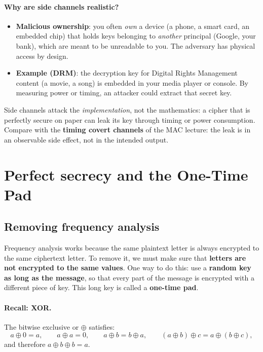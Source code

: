 \paragraph{Why are side channels realistic?}
\begin{itemize}
    \item \textbf{Malicious ownership}: you often \emph{own} a device (a phone, a smart card, an embedded chip) that holds keys belonging to \emph{another} principal (Google, your bank), which are meant to be unreadable to you. The adversary has physical access by design.
    \item \textbf{Example (DRM)}: the decryption key for Digital Rights Management content (a movie, a song) is embedded in your media player or console. By measuring power or timing, an attacker could extract that secret key.
\end{itemize}

\begin{remark}
Side channels attack the \emph{implementation}, not the mathematics: a cipher that is perfectly secure on paper can leak its key through timing or power consumption. Compare with the \textbf{timing covert channels} of the MAC lecture: the leak is in an observable side effect, not in the intended output.
\end{remark}

\section{Perfect secrecy and the One-Time Pad}

\subsection{Removing frequency analysis}

Frequency analysis works because the same plaintext letter is always encrypted to the same ciphertext letter. To remove it, we must make sure that \textbf{letters are not encrypted to the same values}. One way to do this: use a \textbf{random key as long as the message}, so that every part of the message is encrypted with a different piece of key. This long key is called a \textbf{one-time pad}.

\paragraph{Recall: XOR.} The bitwise exclusive or $\oplus$ satisfies:
\[
a \oplus 0 = a, \qquad a \oplus a = 0, \qquad a \oplus b = b \oplus a, \qquad (a \oplus b) \oplus c = a \oplus (b \oplus c),
\]
and therefore $\boxed{a \oplus b \oplus b = a}$.

